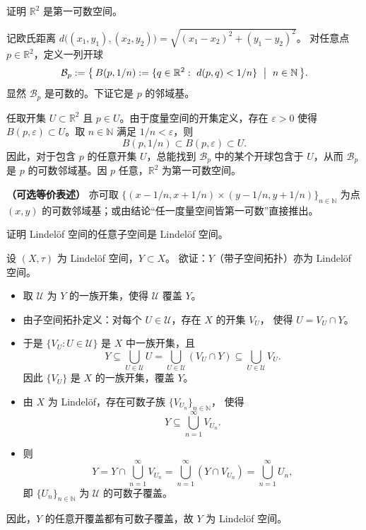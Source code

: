 \begin{homework}[第 9 题]
证明 $\mathbb{R}^2$ 是第一可数空间。
\end{homework}
\begin{solution}
记欧氏距离 $d\bigl((x_1,y_1),(x_2,y_2)\bigr)=\sqrt{(x_1-x_2)^2+(y_1-y_2)^2}$。
对任意点 $p\in\mathbb{R}^2$，定义一列开球
\[
\mathcal{B}_p:=\bigl\{\,B(p,1/n):= \{q\in\mathbb{R}^2:\ d(p,q)<1/n\}\ \bigm|\ n\in\mathbb{N}\,\bigr\}.
\]
显然 $\mathcal{B}_p$ 是可数的。下证它是 $p$ 的邻域基。

任取开集 $U\subset\mathbb{R}^2$ 且 $p\in U$。由于度量空间的开集定义，存在 $\varepsilon>0$ 使得
$B(p,\varepsilon)\subset U$。取 $n\in\mathbb{N}$ 满足 $1/n<\varepsilon$，则
\[
B(p,1/n)\subset B(p,\varepsilon)\subset U.
\]
因此，对于包含 $p$ 的任意开集 $U$，总能找到 $\mathcal{B}_p$ 中的某个开球包含于 $U$，从而
$\mathcal{B}_p$ 是 $p$ 的可数邻域基。因 $p$ 任意，$\mathbb{R}^2$ 为第一可数空间。

\medskip
\textbf{（可选等价表述）} 亦可取
$\{(x-1/n,x+1/n)\times(y-1/n,y+1/n)\}_{n\in\mathbb{N}}$
为点 $(x,y)$ 的可数邻域基；或由结论“任一度量空间皆第一可数”直接推出。
\end{solution}
\begin{homework}[10]
证明 Lindelöf 空间的任意子空间是 Lindelöf 空间。
\end{homework}
\begin{solution}
设 $(X,\tau)$ 为 Lindelöf 空间，$Y\subset X$。  
欲证：$Y$（带子空间拓扑）亦为 Lindelöf 空间。

\begin{itemize}
  \item 取 $\mathcal{U}$ 为 $Y$ 的一族开集，使得 $\mathcal{U}$ 覆盖 $Y$。
  \item 由子空间拓扑定义：对每个 $U\in\mathcal{U}$，存在 $X$ 的开集 $V_U$，
        使得 $U = V_U \cap Y$。
  \item 于是 $\{V_U : U\in\mathcal{U}\}$ 是 $X$ 中一族开集，且
        \[
        Y \subseteq \bigcup_{U\in\mathcal{U}} U
        = \bigcup_{U\in\mathcal{U}} (V_U \cap Y)
        \subseteq \bigcup_{U\in\mathcal{U}} V_U.
        \]
        因此 $\{V_U\}$ 是 $X$ 的一族开集，覆盖 $Y$。
  \item 由 $X$ 为 Lindelöf，存在可数子族 $\{V_{U_n}\}_{n\in\mathbb{N}}$，
        使得
        \[
        Y \subseteq \bigcup_{n=1}^{\infty} V_{U_n}.
        \]
  \item 则
        \[
        Y = Y \cap \bigcup_{n=1}^{\infty} V_{U_n}
        = \bigcup_{n=1}^{\infty} (Y \cap V_{U_n})
        = \bigcup_{n=1}^{\infty} U_n,
        \]
        即 $\{U_n\}_{n\in\mathbb{N}}$ 为 $\mathcal{U}$ 的可数子覆盖。
\end{itemize}

因此，$Y$ 的任意开覆盖都有可数子覆盖，故 $Y$ 为 Lindelöf 空间。
\end{solution}

